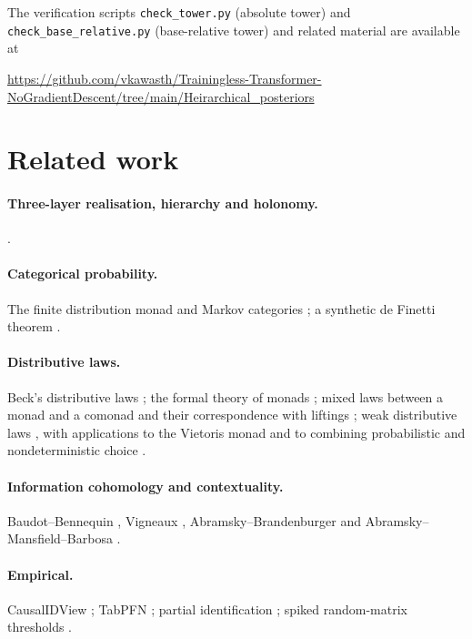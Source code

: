 \documentclass[11pt]{article}
\theoremstyle{definition}
\theoremstyle{remark}
\begin{document}
The verification scripts \texttt{check\_tower.py} (absolute tower) and
\texttt{check\_base\_relative.py} (base-relative tower) and related material are available at
\begin{center}\small\url{https://github.com/vkawasth/Trainingless-Transformer-NoGradientDescent/tree/main/Heirarchical_posteriors}\end{center}

\section{Related work}

\paragraph{Three-layer realisation, hierarchy and holonomy.}
\cite{Awasthi-ThreeLayers,Awasthi-Hierarchy,Awasthi-Holonomy}.
\paragraph{Categorical probability.} The finite distribution monad and Markov categories
\cite{Fritz2020,FGPR2023}; a synthetic de Finetti theorem \cite{FGP2021}.
\paragraph{Distributive laws.} Beck's distributive laws \cite{Beck1969}; the formal theory of monads
\cite{Street1972}; mixed laws between a monad and a comonad and their correspondence with liftings
\cite{PowerWatanabe2002}; weak distributive
laws \cite{Street2009,Bohm2010,BohmLackStreet2011}, with applications to the Vietoris monad
\cite{Garner2020} and to combining probabilistic and nondeterministic choice \cite{GoyPetrisan2020}.
\paragraph{Information cohomology and contextuality.} Baudot--Bennequin \cite{BaudotBennequin2015},
Vigneaux \cite{Vigneaux2019}, Abramsky--Brandenburger \cite{AbramskyBrandenburger2011} and
Abramsky--Mansfield--Barbosa \cite{AbramskyMansfieldBarbosa2012}.
\paragraph{Empirical.} CausalIDView \cite{Awasthi-CausalIDView}; TabPFN \cite{Hollmann2023}; partial
identification \cite{Manski1990}; spiked random-matrix thresholds \cite{BBP2005}.
\end{document}
